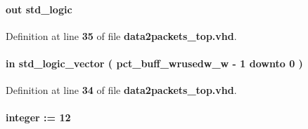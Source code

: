 \paragraph[{pct\+\_\+buff\+\_\+wrreq}]{ {\bfseries \textcolor{keywordflow}{out}\textcolor{vhdlchar}{ }} {\bfseries \textcolor{comment}{std\+\_\+logic}\textcolor{vhdlchar}{ }} \hspace{0.3cm}{\ttfamily [Port]}}\label{classdata2packets__top_aae1a47e0c49979af3cab5172985cf0fc}


Definition at line {\bf 35} of file {\bf data2packets\+\_\+top.\+vhd}.

\paragraph[{pct\+\_\+buff\+\_\+wrusedw}]{ {\bfseries \textcolor{keywordflow}{in}\textcolor{vhdlchar}{ }} {\bfseries \textcolor{comment}{std\+\_\+logic\+\_\+vector}\textcolor{vhdlchar}{ }\textcolor{vhdlchar}{(}\textcolor{vhdlchar}{ }\textcolor{vhdlchar}{ }\textcolor{vhdlchar}{ }\textcolor{vhdlchar}{ }{\bfseries {\bf pct\+\_\+buff\+\_\+wrusedw\+\_\+w}} \textcolor{vhdlchar}{-\/}\textcolor{vhdlchar}{ } \textcolor{vhdldigit}{1} \textcolor{vhdlchar}{ }\textcolor{keywordflow}{downto}\textcolor{vhdlchar}{ }\textcolor{vhdlchar}{ } \textcolor{vhdldigit}{0} \textcolor{vhdlchar}{ }\textcolor{vhdlchar}{)}\textcolor{vhdlchar}{ }} \hspace{0.3cm}{\ttfamily [Port]}}\label{classdata2packets__top_a96f553647c6b2720ae21eb6a51851004}


Definition at line {\bf 34} of file {\bf data2packets\+\_\+top.\+vhd}.

\paragraph[{pct\+\_\+buff\+\_\+wrusedw\+\_\+w}]{ {\bfseries \textcolor{vhdlchar}{ }} {\bfseries \textcolor{comment}{integer}\textcolor{vhdlchar}{ }\textcolor{vhdlchar}{ }\textcolor{vhdlchar}{\+:}\textcolor{vhdlchar}{=}\textcolor{vhdlchar}{ }\textcolor{vhdlchar}{ } \textcolor{vhdldigit}{12} \textcolor{vhdlchar}{ }} \hspace{0.3cm}{\ttfamily [Generic]}}\label{classdata2packets__top_a6874fe211fb9d5278a1fc7e62a2c0e12}


